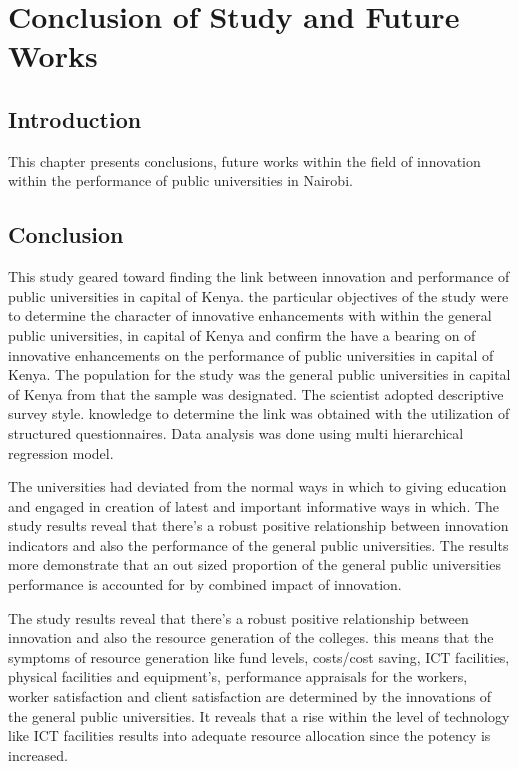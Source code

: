\chapter{\huge{\textbf{Conclusion of Study and Future Works}}}

\section{\textbf{Introduction}}
This chapter presents conclusions, future works within the field of innovation within the performance of public universities in Nairobi.
\section{\textbf{Conclusion}}
This study geared toward finding the link between innovation and performance of public universities in capital of Kenya. the particular objectives of the study were to determine the character of innovative enhancements with within the general public universities, in capital of Kenya and confirm the have a bearing on of innovative enhancements on the performance of public universities in capital of Kenya. The population for the study was the general public universities in capital of Kenya from that the sample was designated. The scientist adopted descriptive survey style. knowledge to determine the link was obtained with the utilization of structured questionnaires. Data analysis was done using multi hierarchical regression model.

The universities had deviated from the normal ways in which to giving education and engaged in creation of latest and important informative ways in which. The study results reveal that there's a robust positive relationship between innovation indicators and also the performance of the general public universities. The results more demonstrate that an out sized proportion of the general public universities performance is accounted for by combined impact of innovation.

The study results reveal that there's a robust positive relationship between innovation and also the resource generation of the colleges. this means that the symptoms of resource generation like fund levels, costs/cost saving, ICT facilities, physical facilities and equipment’s, performance appraisals for the workers, worker satisfaction and client satisfaction are determined by the innovations of the general public universities. It reveals that a rise within the level of technology like ICT facilities results into adequate resource allocation since the potency is increased.

